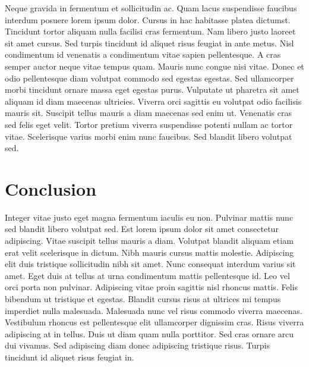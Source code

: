 Neque gravida in fermentum et sollicitudin ac. Quam lacus suspendisse
faucibus interdum posuere lorem ipsum dolor. Cursus in hac habitasse
platea dictumst. Tincidunt tortor aliquam nulla facilisi cras fermentum.
Nam libero justo laoreet sit amet cursus. Sed turpis tincidunt id
aliquet risus feugiat in ante metus. Nisl condimentum id venenatis a
condimentum vitae sapien pellentesque. A cras semper auctor neque vitae
tempus quam. Mauris nunc congue nisi vitae. Donec et odio pellentesque
diam volutpat commodo sed egestas egestas. Sed ullamcorper morbi
tincidunt ornare massa eget egestas purus. Vulputate ut pharetra sit
amet aliquam id diam maecenas ultricies. Viverra orci sagittis eu
volutpat odio facilisis mauris sit. Suscipit tellus mauris a diam
maecenas sed enim ut. Venenatis cras sed felis eget velit. Tortor
pretium viverra suspendisse potenti nullam ac tortor vitae. Scelerisque
varius morbi enim nunc faucibus. Sed blandit libero volutpat sed.

\hypertarget{conclusion}{%
\section{Conclusion}\label{conclusion}}

Integer vitae justo eget magna fermentum iaculis eu non. Pulvinar mattis
nunc sed blandit libero volutpat sed. Est lorem ipsum dolor sit amet
consectetur adipiscing. Vitae suscipit tellus mauris a diam. Volutpat
blandit aliquam etiam erat velit scelerisque in dictum. Nibh mauris
cursus mattis molestie. Adipiscing elit duis tristique sollicitudin nibh
sit amet. Nunc consequat interdum varius sit amet. Eget duis at tellus
at urna condimentum mattis pellentesque id. Leo vel orci porta non
pulvinar. Adipiscing vitae proin sagittis nisl rhoncus mattis. Felis
bibendum ut tristique et egestas. Blandit cursus risus at ultrices mi
tempus imperdiet nulla malesuada. Malesuada nunc vel risus commodo
viverra maecenas. Vestibulum rhoncus est pellentesque elit ullamcorper
dignissim cras. Risus viverra adipiscing at in tellus. Duis ut diam quam
nulla porttitor. Sed cras ornare arcu dui vivamus. Sed adipiscing diam
donec adipiscing tristique risus. Turpis tincidunt id aliquet risus
feugiat in.
